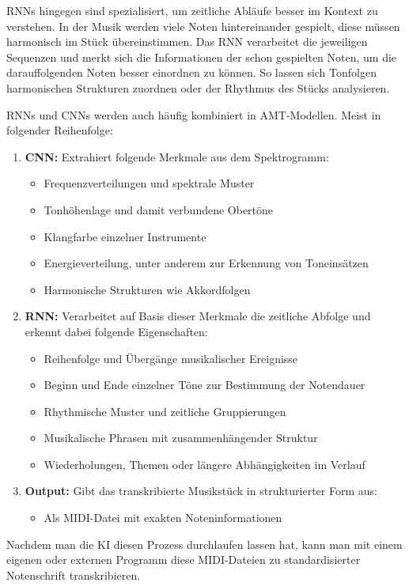 RNNs hingegen sind spezialisiert, um zeitliche Abläufe besser im Kontext zu verstehen.
In der Musik werden viele Noten hintereinander gespielt, diese müssen harmonisch im Stück übereinstimmen.
Das RNN verarbeitet die jeweiligen Sequenzen und merkt sich die Informationen der schon gespielten Noten,
um die darauffolgenden Noten besser einordnen zu können.
So lassen sich Tonfolgen harmonischen Strukturen zuordnen oder der Rhythmus des Stücks analysieren.
\cite{Boeck2012}

RNNs und CNNs werden auch häufig kombiniert in AMT-Modellen.
Meist in folgender Reihenfolge:
\begin{enumerate}
    \item \textbf{CNN:} Extrahiert folgende Merkmale aus dem Spektrogramm:
    \begin{itemize}
        \item Frequenzverteilungen und spektrale Muster
        \item Tonhöhenlage und damit verbundene Obertöne
        \item Klangfarbe einzelner Instrumente
        \item Energieverteilung, unter anderem zur Erkennung von Toneinsätzen
        \item Harmonische Strukturen wie Akkordfolgen
    \end{itemize}

    \item \textbf{RNN:} Verarbeitet auf Basis dieser Merkmale die zeitliche Abfolge und erkennt dabei folgende Eigenschaften:
    \begin{itemize}
        \item Reihenfolge und Übergänge musikalischer Ereignisse
        \item Beginn und Ende einzelner Töne zur Bestimmung der Notendauer
        \item Rhythmische Muster und zeitliche Gruppierungen
        \item Musikalische Phrasen mit zusammenhängender Struktur
        \item Wiederholungen, Themen oder längere Abhängigkeiten im Verlauf
    \end{itemize}

    \item \textbf{Output:} Gibt das transkribierte Musikstück in strukturierter Form aus:
    \begin{itemize}
        \item Als MIDI-Datei mit exakten Noteninformationen
    \end{itemize}
\end{enumerate}
Nachdem man die KI diesen Prozess durchlaufen lassen hat, kann man mit einem eigenen oder externen Programm
diese MIDI-Dateien zu standardisierter Notenschrift transkribieren.

